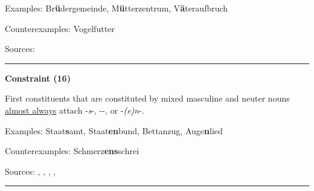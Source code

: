 \vspace{0.3em}

\noindent
Examples: Br\textbf{ü}der{\zeroLinker}gemeinde, M\textbf{ü}tter{\zeroLinker}zentrum, V\textbf{ä}ter{\zeroLinker}aufbruch

\noindent
Counterexamples: Vogel{\zeroLinker}futter

\vspace{0.3em}

\noindent
Sources: \citet[29]{schaefer_pankratz_2018}


\hrule




\vspace{0.4em}

\begin{center}
\textbf{Constraint (16)}
\end{center}

\noindent
First constituents that are constituted by mixed masculine and neuter nouns \underline{almost always} attach -\textit{s}-, \mbox{-{\zeroLinker}-}, or -\textit{(e)n}-.
\vspace{0.35em}


\vspace{0.3em}

\noindent
Examples: Staat\textbf{s}amt, Staat\textbf{en}bund, Bett{\zeroLinker}anzug, Auge\textbf{n}lied

\noindent
Counterexamples: Schmerz\textbf{ens}schrei

\vspace{0.3em}

\noindent
Sources: \citet[3]{krott_etal_2007}, \citet[80]{nuebling_szczepaniak_2013}, \citet[92]{ortner_mueller-bollhagen_1991}, \citet[229]{schaefer_2018}, \citet[9]{schaefer_pankratz_2018}


\hrule




\vspace{0.4em}


